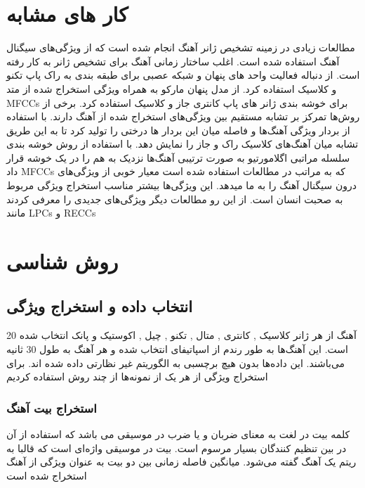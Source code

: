 \documentclass[conference]{IEEEtran}
\begin{document}
    \section{کار های مشابه}
    مطالعات زیادی در زمینه تشخیص ژانر آهنگ انجام شده است که از ویژگی‌های سیگنال آهنگ استفاده شده است. اغلب ساختار زمانی آهنگ    برای تشخیص ژانر به کار رفته است. از دنباله فعالیت واحد های پنهان و شبکه عصبی برای طبقه بندی به راک پاپ تکنو و کلاسیک استفاده کرد. از مدل پنهان مارکو      به همراه ویژگی استخراج شده از متد MFCCs      برای خوشه بندی ژانر های پاپ کانتری جاز و کلاسیک استفاده کرد.
    برخی از روش‌ها تمرکز بر تشابه مستقیم بین ویژگی‌های استخراج شده از آهنگ دارند.
    با استفاده از بردار ویژگی آهنگ‌ها و فاصله میان این بردار ها درختی را تولید کرد تا به این طریق تشابه میان آهنگ‌های کلاسیک راک و جاز را نمایش دهد. با استفاده از روش خوشه بندی سلسله مراتبی اگلامورتیو به صورت ترتیبی آهنگ‌ها نزدیک به هم را در یک خوشه قرار داد 
    MFCCs که به مراتب در مطالعات استفاده شده است معیار خوبی از ویژگی‌های درون سیگنال آهنگ را به ما میدهد. این ویژگی‌ها بیشتر مناسب استخراج ویژگی مربوط به صحبت انسان است. از این رو مطالعات دیگر ویژگی‌های جدیدی را معرفی کردند مانند LPCs       و   RECCs  
    
    \section{ روش شناسی}
    \subsection{ انتخاب داده و استخراج ویژگی }
    20 آهنگ از هر ژانر کلاسیک    , کانتری   , متال    , تکنو    , چیل    , اکوستیک     و پانک      انتخاب شده است. این آهنگ‌ها به طور رندم از اسپاتیفای انتخاب شده و هر آهنگ به طول 30 ثانیه می‌باشند. این داده‌ها بدون هیچ برچسبی به الگوریتم غیر نظارتی داده شده اند.
     برای استخراج ویژگی از هر یک از نمونه‌ها از چند روش استفاده کردیم
    \subsubsection{استخراج بیت     آهنگ}
    کلمه بیت در لغت به معنای ضربان و یا ضرب در موسیقی می باشد که استفاده از آن در بین تنظیم کنندگان بسیار مرسوم است. بیت در موسیقی واژه‌ای است که قالبا به ریتم یک آهنگ گفته می‌شود. میانگین فاصله زمانی بین دو بیت به عنوان ویژگی از آهنگ استخراج شده است
\end{document}
